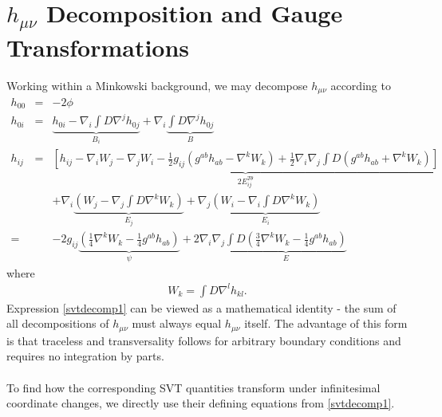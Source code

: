 \documentclass[10pt,letterpaper]{article}
\numberwithin{equation}{section}
\begin{document}
\section{$h_{\mu\nu}$ Decomposition and Gauge Transformations}
Working within a Minkowski background, we may decompose $h_{\mu\nu}$ according to
\begin{eqnarray}
h_{00} &=& -2\phi
\nonumber\\
h_{0i}&=& \underbrace{h_{0i}-\nabla_i \int D \nabla^j h_{0j}}_{B_i} + \nabla_i \underbrace{\int D\nabla^j h_{0j}}_{B}
\nonumber\\
h_{ij}&=&\underbrace{\left[ h_{ij} - \nabla_i W_j - \nabla_j W_i - \frac12 g_{ij}(g^{ab}h_{ab}-\nabla^k W_k) + \frac12 \nabla_i \nabla_j \int D(g^{ab}h_{ab}+\nabla^k W_k) \right]}_{2E^{T\theta}_{ij}}
\nonumber\\
&& + \nabla_i \underbrace{\left(W_j - \nabla_j \int D \nabla^k W_k\right)}_{E_j}+
\nabla_j \underbrace{\left(W_i - \nabla_i \int D \nabla^k W_k\right)}_{E_i}
\nonumber\\=
&&
-2 g_{ij}\underbrace{(\tfrac14\nabla^k W_k-\tfrac14 g^{ab}h_{ab} )}_{\psi}
+2\nabla_i\nabla_j \underbrace{\int D (\tfrac34 \nabla^k  W_{k}-\tfrac14 g^{ab}h_{ab} )}_{E}
\label{svtdecomp1}
\end{eqnarray}
where
\begin{eqnarray}
W_k = \int D \nabla^l h_{kl}.
\end{eqnarray}
Expression \eqref{svtdecomp1} can be viewed as a mathematical identity - the sum of all decompositions of $h_{\mu\nu}$ must always equal $h_{\mu\nu}$ itself. The advantage of this form is that traceless and transversality follows for arbitrary boundary conditions and requires no integration by parts. 
\\ \\
To find how the corresponding SVT quantities transform under infinitesimal coordinate changes, we directly use their defining equations from \eqref{svtdecomp1}. 
\end{document}
